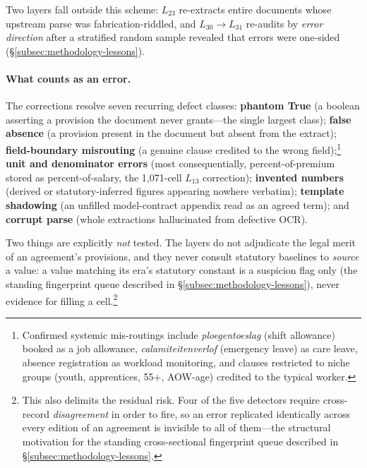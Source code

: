 Two layers fall outside this scheme: $L_{23}$ re-extracts entire documents whose upstream parse was fabrication-riddled, and $L_{30} \rightarrow L_{31}$ re-audits by \emph{error direction} after a stratified random sample revealed that errors were one-sided (\S\ref{subsec:methodology-lessons}).

\paragraph{What counts as an error.} The corrections resolve seven recurring defect classes: \textbf{phantom True} (a boolean asserting a provision the document never grants---the single largest class); \textbf{false absence} (a provision present in the document but absent from the extract); \textbf{field-boundary misrouting} (a genuine clause credited to the wrong field);\footnote{Confirmed systemic mis-routings include \textit{ploegentoeslag} (shift allowance) booked as a job allowance, \textit{calamiteitenverlof} (emergency leave) as care leave, absence registration as workload monitoring, and clauses restricted to niche groups (youth, apprentices, 55+, AOW-age) credited to the typical worker.} \textbf{unit and denominator errors} (most consequentially, percent-of-premium stored as percent-of-salary, the 1,071-cell $L_{13}$ correction); \textbf{invented numbers} (derived or statutory-inferred figures appearing nowhere verbatim); \textbf{template shadowing} (an unfilled model-contract appendix read as an agreed term); and \textbf{corrupt parse} (whole extractions hallucinated from defective OCR).

Two things are explicitly \emph{not} tested. The layers do not adjudicate the legal merit of an agreement's provisions, and they never consult statutory baselines to \emph{source} a value: a value matching its era's statutory constant is a suspicion flag only (the standing fingerprint queue described in \S\ref{subsec:methodology-lessons}), never evidence for filling a cell.\footnote{This also delimits the residual risk. Four of the five detectors require cross-record \emph{disagreement} in order to fire, so an error replicated identically across every edition of an agreement is invisible to all of them---the structural motivation for the standing cross-sectional fingerprint queue described in \S\ref{subsec:methodology-lessons}.}

